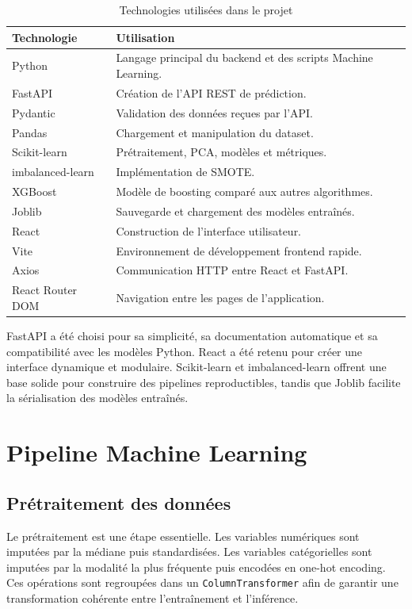 \documentclass[12pt,a4paper]{report}
\begin{document}
\begin{longtable}{p{4cm}p{9cm}}
\caption{Technologies utilisées dans le projet}\\
\toprule
\textbf{Technologie} & \textbf{Utilisation}\\
\midrule
Python & Langage principal du backend et des scripts Machine Learning.\\
FastAPI & Création de l'API REST de prédiction.\\
Pydantic & Validation des données reçues par l'API.\\
Pandas & Chargement et manipulation du dataset.\\
Scikit-learn & Prétraitement, PCA, modèles et métriques.\\
imbalanced-learn & Implémentation de SMOTE.\\
XGBoost & Modèle de boosting comparé aux autres algorithmes.\\
Joblib & Sauvegarde et chargement des modèles entraînés.\\
React & Construction de l'interface utilisateur.\\
Vite & Environnement de développement frontend rapide.\\
Axios & Communication HTTP entre React et FastAPI.\\
React Router DOM & Navigation entre les pages de l'application.\\
\bottomrule
\end{longtable}

FastAPI a été choisi pour sa simplicité, sa documentation automatique et sa compatibilité avec les modèles Python. React a été retenu pour créer une interface dynamique et modulaire. Scikit-learn et imbalanced-learn offrent une base solide pour construire des pipelines reproductibles, tandis que Joblib facilite la sérialisation des modèles entraînés.

\section{Pipeline Machine Learning}

\subsection{Prétraitement des données}
Le prétraitement est une étape essentielle. Les variables numériques sont imputées par la médiane puis standardisées. Les variables catégorielles sont imputées par la modalité la plus fréquente puis encodées en one-hot encoding. Ces opérations sont regroupées dans un \texttt{ColumnTransformer} afin de garantir une transformation cohérente entre l'entraînement et l'inférence.
\end{document}
